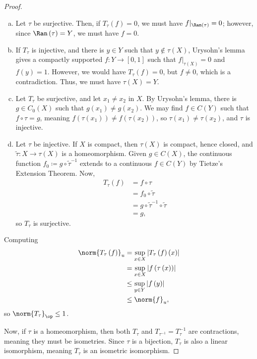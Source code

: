 \documentclass[10pt]{mypackage}
\begin{document}
\begin{proof}\hfill
  \begin{enumerate}[(a)]
    \item Let $\tau$ be surjective. Then, if $T_{\tau}\left( f \right) = 0$, we must have $f|_{\Ran\left( \tau \right)} = 0$; however, since $\Ran\left( \tau \right) = Y$, we must have $f = 0$.

    \item If $T_{\tau}$ is injective, and there is $y\in Y$ such that $y\notin \tau\left( X \right)$, Urysohn's lemma gives a compactly supported $f\colon Y\rightarrow [0,1]$ such that $f|_{\tau\left( X \right)} = 0$ and $f(y) = 1$. However, we would have $T_{\tau}\left( f \right) = 0$, but $f\neq 0$, which is a contradiction. Thus, we must have $\tau\left( X \right) = Y$.
    \item Let $T_{\tau}$ be surjective, and let $x_1\neq x_2$ in $X$. By Urysohn's lemma, there is $g\in C_0\left( X \right)$ such that $g\left( x_1 \right)\neq g\left( x_2 \right)$. We may find $f\in C\left( Y \right)$ such that $f\circ\tau = g$, meaning $f\left( \tau\left( x_1 \right) \right) \neq f\left( \tau\left( x_2 \right) \right)$, so $\tau\left( x_1 \right)\neq \tau\left( x_2 \right)$, and $\tau$ is injective.
    \item Let $\tau$ be injective. If $X$ is compact, then $\tau\left( X \right)$ is compact, hence closed, and $\widetilde{\tau}\colon X \rightarrow \tau\left( X \right)$ is a homeomorphism. Given $g\in C\left( X \right)$, the continuous function $f_0\coloneq g\circ \widetilde{\tau}^{-1}$ extends to a continuous $f\in C\left( Y \right)$ by Tietze's Extension Theorem. Now,
      \begin{align*}
        T_{\tau}\left( f \right) &= f\circ\tau\\
                                 &= f_0\circ\widetilde{\tau}\\
                                 &= g\circ \widetilde{\tau}^{-1}\circ\widetilde{\tau}\\
                                 &= g,
      \end{align*}
      so $T_{\tau}$ is surjective.
  \end{enumerate}
  Computing
  \begin{align*}
    \norm{T_{\tau}\left( f \right)}_{u} &= \sup_{x\in X}\left\vert T_{\tau}\left( f \right)\left( x \right) \right\vert\\
                                        &= \sup_{x\in X} \left\vert f\left( \tau\left( x \right) \right) \right\vert\\
                                        &\leq \sup_{y\in Y}\left\vert f\left( y \right) \right\vert\\
                                        &\leq \norm{f}_{u},
  \end{align*}
  so $\norm{T_{\tau}}_{\op}\leq 1$.\newline

  Now, if $\tau$ is a homeomorphism, then both $T_{\tau}$ and $T_{\tau^{-1}} = T_{\tau}^{-1}$ are contractions, meaning they must be isometries. Since $\tau$ is a bijection, $T_{\tau}$ is also a linear isomorphism, meaning $T_{\tau}$ is an isometric isomorphism.
\end{proof}
\end{document}
